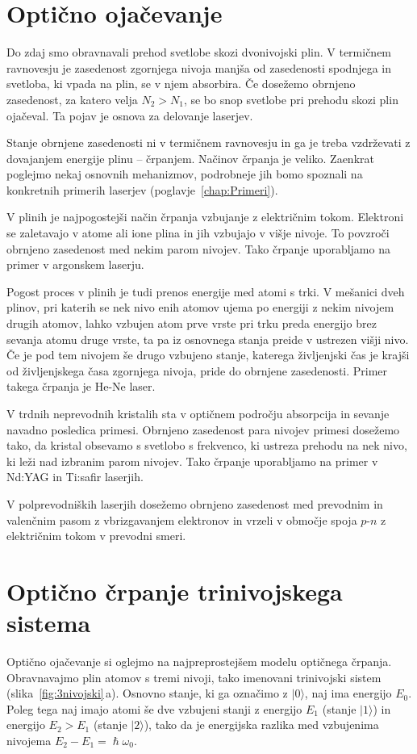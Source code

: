 \section{Optično ojačevanje}
Do zdaj smo obravnavali prehod svetlobe skozi dvonivojski plin. V 
termičnem ravnovesju je zasedenost zgornjega nivoja manjša od zasedenosti spodnjega in 
svetloba, ki vpada na plin, se v njem absorbira. 
Če dosežemo  obrnjeno zasedenost,
za katero velja $N_{2}>N_{1}$, se bo snop svetlobe pri prehodu 
skozi plin ojačeval. Ta pojav
je osnova za delovanje laserjev. 

Stanje obrnjene zasedenosti ni v termičnem ravnovesju 
in ga je treba vzdrževati z dovajanjem 
energije plinu -- črpanjem.
Načinov črpanja je veliko. Zaenkrat poglejmo
nekaj osnovnih mehanizmov, podrobneje jih bomo spoznali na konkretnih primerih 
laserjev (poglavje~\ref{chap:Primeri}).

V plinih je najpogostejši način črpanja vzbujanje z električnim tokom. Elektroni
se zaletavajo v atome ali ione plina in jih vzbujajo
v višje nivoje. To povzroči obrnjeno zasedenost med
nekim parom nivojev. Tako črpanje uporabljamo na primer v argonskem laserju. 

Pogost proces v plinih je tudi prenos energije med atomi s trki. V
mešanici dveh plinov, pri katerih se nek nivo enih atomov ujema po energiji z
nekim nivojem drugih atomov, lahko vzbujen atom prve vrste pri trku preda 
energijo brez sevanja atomu druge vrste, ta pa iz osnovnega stanja preide v 
ustrezen višji nivo. Če je pod tem nivojem še drugo vzbujeno stanje, katerega
življenjski čas je krajši od življenjskega časa zgornjega nivoja, pride
do obrnjene zasedenosti. Primer takega črpanja je He-Ne laser.

V trdnih neprevodnih kristalih sta v optičnem področju absorpcija
in sevanje navadno posledica primesi.
Obrnjeno zasedenost para nivojev primesi dosežemo tako, da
kristal obsevamo s svetlobo s frekvenco, ki ustreza prehodu na nek
nivo, ki leži nad izbranim parom nivojev. Tako črpanje uporabljamo na primer v Nd:YAG in Ti:safir laserjih.
 

V polprevodniških laserjih dosežemo obrnjeno zasedenost med 
prevodnim in valenčnim pasom z vbrizgavanjem elektronov in vrzeli v območje spoja $p$-$n$ 
z električnim tokom v prevodni smeri. 

\section{Optično črpanje trinivojskega sistema}
Optično ojačevanje si oglejmo na najpreprostejšem modelu optičnega črpanja.
Obravnavajmo plin atomov s tremi nivoji, tako imenovani trinivojski sistem (slika~\ref{fig:3nivojski}\,a). Osnovno stanje, ki 
ga označimo z $|0\rangle$,  naj ima energijo $E_0$. Poleg tega naj imajo atomi še 
dve vzbujeni stanji z energijo $E_1$ (stanje $|1\rangle$) in energijo $E_2>E_1$
(stanje $|2\rangle$), tako da je energijska razlika med vzbujenima nivojema $E_2-E_1 = \hslash \omega_0$.

